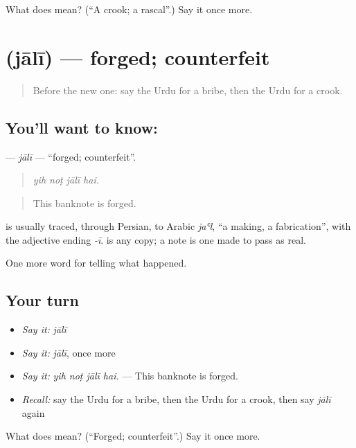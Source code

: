 \begin{tcolorbox}[breakable,colback=teal!4,colframe=teal!35!black,title={Before you move on}]
What does  mean? (\textquotedblleft{}A crook; a rascal\textquotedblright{}.) Say it once more.
\end{tcolorbox}
\section[\texorpdfstring{\ur{جعلی} (jālī)}{جعلی (jālī)}]{ (jālī) — forged; counterfeit}

\label{lesson:UR-C281-jali}



\begin{quote}
Before the new one: say the Urdu for a bribe, then the Urdu for a crook.
\end{quote}

\subsection*{You'll want to know: }
\textbf{} — \emph{jālī} — \textquotedblleft{}forged; counterfeit\textquotedblright{}.

\begin{quote}
   
\end{quote}

\begin{quote}
\emph{yih noṭ jālī hai.}
\end{quote}

\begin{quote}
This banknote is forged.
\end{quote}

\begin{cousinweb}
is usually traced, through Persian, to Arabic \emph{jaʿl}, \textquotedblleft{}a making, a fabrication\textquotedblright{}, with the adjective ending \emph{-ī}. \textbf{} is any copy; a \textbf{} note is one made to pass as real.
\end{cousinweb}

\begin{grammarlens}[title={What you've built}]
One more word for telling what happened.
\end{grammarlens}

\subsection*{Your turn}
\begin{itemize}
\raggedright
  \item \emph{Say it:} \emph{jālī}
  \item \emph{Say it:} \emph{jālī}, once more
  \item \emph{Say it:} \emph{yih noṭ jālī hai.} — This banknote is forged.
  \item \emph{Recall:} say the Urdu for a bribe, then the Urdu for a crook, then say \emph{jālī} again
\end{itemize}

\begin{tcolorbox}[breakable,colback=teal!4,colframe=teal!35!black,title={Before you move on}]
What does  mean? (\textquotedblleft{}Forged; counterfeit\textquotedblright{}.) Say it once more.
\end{tcolorbox}
